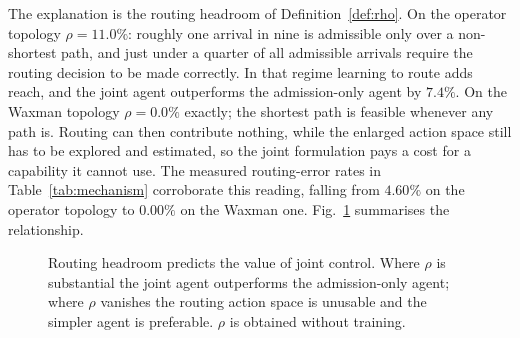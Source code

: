 \documentclass[10pt,journal,comsoc]{IEEEtran}
\begin{document}
The explanation is the routing headroom of Definition~\ref{def:rho}. On
the operator topology $\rho = 11.0\%$: roughly one arrival in nine is
admissible only over a non-shortest path, and just under a quarter of all
admissible arrivals require the routing decision to be made correctly. In
that regime learning to route adds reach, and the joint agent
outperforms the admission-only agent by $7.4\%$. On the Waxman topology
$\rho = 0.0\%$ exactly; the shortest path is feasible whenever any path
is. Routing can then contribute nothing, while the enlarged action space
still has to be explored and estimated, so the joint formulation pays a
cost for a capability it cannot use. The measured routing-error rates in
Table~\ref{tab:mechanism} corroborate this reading, falling from $4.60\%$
on the operator topology to $0.00\%$ on the Waxman one.
Fig.~\ref{fig:rho} summarises the relationship.

\begin{figure}[t]
\centering
{}
\caption{Routing headroom predicts the value of joint control. Where
$\rho$ is substantial the joint agent outperforms the admission-only
agent; where $\rho$ vanishes the routing action space is unusable and the
simpler agent is preferable. $\rho$ is obtained without training.}
\label{fig:rho}
\end{figure}
\end{document}
